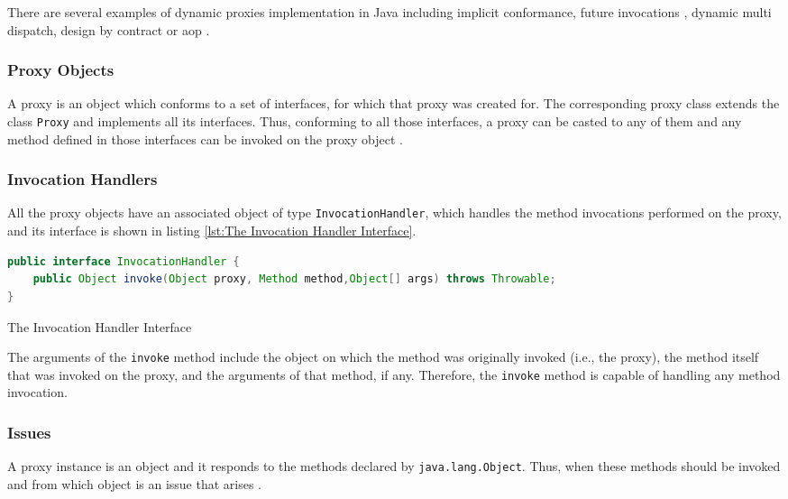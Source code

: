 There are several examples of dynamic proxies implementation in Java including implicit conformance, future invocations \cite{pratikakis2004transparent}, dynamic multi dispatch, design by contract or \ac{aop} \cite{eugster2006uniform}.

\subsubsection{Proxy Objects}\label{Proxy Objects}
A proxy is an object which conforms to a set of interfaces, for which that proxy was created for. 
The corresponding proxy class extends the class \texttt{Proxy} and implements all its interfaces.
Thus, conforming to all those interfaces, a proxy can be casted to any of them and any method defined in those interfaces can be invoked on the proxy object \cite{eugster2006uniform}.

\subsubsection{Invocation Handlers}\label{Invocation Handlers}
All the proxy objects have an associated object of type \texttt{InvocationHandler}, which handles the method invocations performed on the proxy, and its interface is shown in listing \ref{lst:The Invocation Handler Interface}.

\begin{sourcecode}
	\begin{lstlisting}[language=Java]
public interface InvocationHandler {
	public Object invoke(Object proxy, Method method,Object[] args) throws Throwable;
}		
	\end{lstlisting}
	\caption{The Invocation Handler Interface}
	\label{lst:The Invocation Handler Interface}
\end{sourcecode}

The arguments of the \texttt{invoke} method include the object on which the method was originally invoked (i.e., the proxy), the method itself that was invoked on the proxy, and the arguments of that method, if any.
Therefore, the \texttt{invoke} method is capable of handling any method invocation.

\subsubsection{Issues}\label{Dynamic Proxies Issues}
A proxy instance is an object and it responds to the methods declared by \texttt{java.lang.Object}. 
Thus, when these methods should be invoked and from which object is an issue that arises \cite{forman2004java}.

